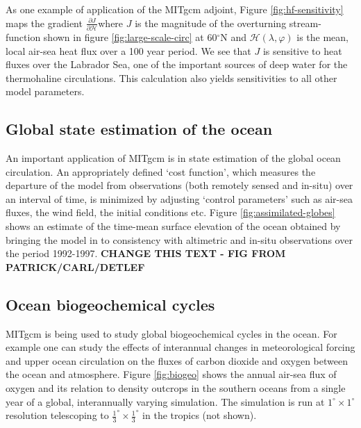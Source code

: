 As one example of application of the MITgcm adjoint, Figure \ref{fig:hf-sensitivity}
maps the gradient $\frac{\partial J}{\partial \mathcal{H}}$where $J$ is the magnitude
of the overturning stream-function shown in figure \ref{fig:large-scale-circ}
at 60$^{\circ }$N and $
\mathcal{H}(\lambda,\varphi)$ is the mean, local air-sea heat flux over
a 100 year period. We see that $J$ is
sensitive to heat fluxes over the Labrador Sea, one of the important sources
of deep water for the thermohaline circulations. This calculation also
yields sensitivities to all other model parameters.



\subsection{Global state estimation of the ocean}

An important application of MITgcm is in state estimation of the global
ocean circulation. An appropriately defined `cost function', which measures
the departure of the model from observations (both remotely sensed and
in-situ) over an interval of time, is minimized by adjusting `control
parameters' such as air-sea fluxes, the wind field, the initial conditions
etc. Figure \ref{fig:assimilated-globes} shows an estimate of the time-mean
surface elevation of the ocean obtained by bringing the model in to
consistency with altimetric and in-situ observations over the period
1992-1997. {\bf CHANGE THIS TEXT - FIG FROM PATRICK/CARL/DETLEF}



\subsection{Ocean biogeochemical cycles}

MITgcm is being used to study global biogeochemical cycles in the ocean. For
example one can study the effects of interannual changes in meteorological
forcing and upper ocean circulation on the fluxes of carbon dioxide and
oxygen between the ocean and atmosphere. Figure \ref{fig:biogeo} shows 
the annual air-sea flux of oxygen and its relation to density outcrops in 
the southern oceans from a single year of a global, interannually varying 
simulation. The simulation is run at $1^{\circ}\times1^{\circ}$ resolution
telescoping to $\frac{1}{3}^{\circ}\times\frac{1}{3}^{\circ}$ in the tropics (not shown).

